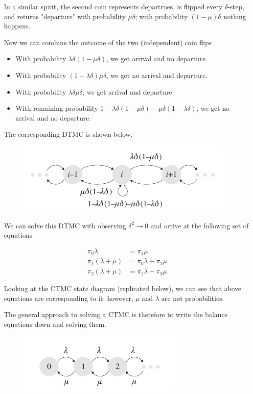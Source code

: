 In a similar spirit, the second coin represents departrues, is flipped every $\delta$-step, and returns "departure" with probability $\mu \delta$; with probability $(1-\mu)\delta$ nothing happens.

Now we can combine the outcome of the two (independent) coin flips

\begin{itemize}

\item With probability $\lambda \delta (1-\mu \delta)$, we get arrival and no departure.

\item With probability $(1 - \lambda \delta) \mu \delta$, we get no arrival and departure.

\item With probability $\lambda \delta \mu \delta$, we get arrival and departure.

\item With remaining probability $1 - \lambda \delta (1 - \mu \delta)-\mu\delta(1-\lambda \delta)$, we get no arrival and no departure.

\end{itemize}

The corresponding DTMC is shown below.

\begin{figure}[hbt!]
\centering
\includegraphics[scale=0.75]{images/queuing_02_03.png}
\end{figure}

We can solve this DTMC with observing $\delta^2 \rightarrow 0$ and arrive at the following set of equations

\begin{align*}
\pi_0 \lambda &= \pi_1 \mu \\
\pi_1(\lambda + \mu) &= \pi_0 \lambda + \pi_2 \mu \\
\pi_2(\lambda + \mu) &= \pi_1 \lambda + \pi_3 \mu
\end{align*}

Looking at the CTMC state diagram (replicated below), we can see that above equations are corresponding to it; however, $\mu$ and $\lambda$ are not probabilities.

The general approach to solving a CTMC is therefore to write the balance equations down and solving them.


\begin{figure}[hbt!]
\centering
\includegraphics[scale=0.75]{images/queuing_02_02.png}
\end{figure}





